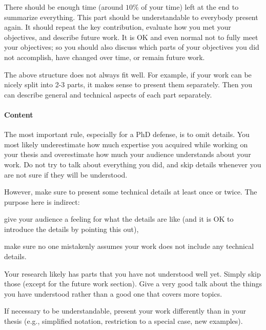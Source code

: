 \documentclass[12pt]{article}
\begin{document}
There should be enough time (around $10\%$ of your time) left at the end to summarize everything.
This part should be understandable to everybody present again.
It should repeat the key contribution, evaluate how you met your objectives, and describe future work.
It is OK and even normal not to fully meet your objectives; so you should also discuss which parts of your objectives you did not accomplish, have changed over time, or remain future work.
\medskip

The above structure does not always fit well.
For example, if your work can be nicely split into 2-3 parts, it makes sense to present them separately.
Then you can describe general and technical aspects of each part separately.

\paragraph{Content}
The most important rule, especially for a PhD defense, is to omit details.
You most likely underestimate how much expertise you acquired while working on your thesis and overestimate how much your audience understands about your work.
Do not try to talk about everything you did, and skip details whenever you are not sure if they will be understood.
\medskip

However, make sure to present some technical details at least once or twice.
The purpose here is indirect:
\begin{compactitem}
 \item give your audience a feeling for what the details are like (and it is OK to introduce the details by pointing this out),
 \item make sure no one mistakenly assumes your work does not include any technical details.
\end{compactitem}
\medskip

Your research likely has parts that you have not understood well yet.
Simply skip those (except for the future work section).
Give a very good talk about the things you have understood rather than a good one that covers more topics.
\medskip

If necessary to be understandable, present your work differently than in your thesis (e.g., simplified notation, restriction to a special case, new examples).
\end{document}
